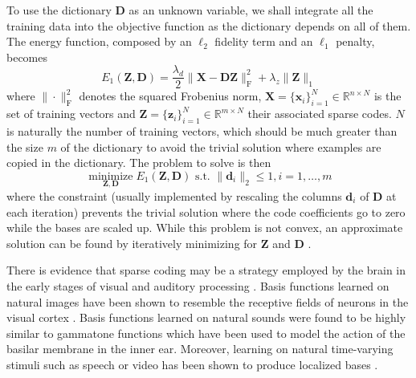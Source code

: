\documentclass[a4paper,12pt,twoside]{report}
\newcommand{\R}{\mathbb{R}}
\DeclareMathOperator*{\minimizeop}{minimize}
\newcommand{\minimize}[1]{\minimizeop\limits_{#1}}  %
\newcommand{\normO}[1]{\| #1 \|_1}
\newcommand{\normF}[1]{\| #1 \|_\text{F}^2}
\newcommand{\D}{\mathbf{D}}
\newcommand{\X}{\mathbf{X}}
\newcommand{\Z}{\mathbf{Z}}
\renewcommand{\d}{\mathbf{d}}
\newcommand{\x}{\mathbf{x}}
\newcommand{\z}{\mathbf{z}}
\newcommand{\Eone}{E_1(\Z, \D)}
\newcommand{\set}[2]{\{#1_i\}_{i=1}^#2}
\newcommand{\st}{\text{ s.t. }}
\newcommand{\cst}[2]{\|#1_#2\|_2 \leq 1}
\newcommand{\forallx}[2]{#1 = 1, \ldots, #2}
\newcommand{\cstd}{\cst{\d}{i}, \forallx{i}{m}}
\begin{document}
To use the dictionary $\D$ as an unknown variable, we shall integrate all the training data into the objective function as the dictionary depends on all of them. The energy function, composed by an $\ell_2$ fidelity term and an $\ell_1$ penalty, becomes
\begin{equation}\label{eqn:en_dict}
	\Eone = \frac{\lambda_d}{2} \normF{\X - \D \Z} + \lambda_z \normO{\Z}
\end{equation}
where $\normF{\cdot}$ denotes the squared Frobenius norm, $\X = \set{\x}{N} \in \R^{n \times N}$ is the set of training vectors and $\Z = \set{\z}{N} \in \R^{m \times N}$ their associated sparse codes. $N$ is naturally the number of training vectors, which should be much greater than the size $m$ of the dictionary to avoid the trivial solution where examples are copied in the dictionary. The problem to solve is then
\begin{equation}\label{eqn:pr_dict}
	\minimize{\Z,\D} \Eone \st \cstd
\end{equation}
where the constraint (usually implemented by rescaling the columns $\d_i$ of $\D$ at each iteration) prevents the trivial solution where the code coefficients go to zero while the bases are scaled up. While this problem is not convex, an approximate solution can be found by iteratively minimizing for $\Z$ and $\D$ \cite{olshausen1996SparseV1}.

There is evidence that sparse coding may be a strategy employed by the brain in the early stages of visual and auditory processing \cite{olshausen1996SparseV1, olshausen1997SparseV1, smith2006SparseAudio}. Basis functions learned on natural images have been shown to resemble the receptive fields of neurons in the visual cortex \cite{olshausen1996SparseV1, olshausen1997SparseV1}. Basis functions learned on natural sounds were found to be highly similar to gammatone functions \cite{smith2006SparseAudio} which have been used to model the action of the basilar membrane in the inner ear. Moreover, learning on natural time-varying stimuli such as speech or video has been shown to produce localized bases \cite{lewicki2000SparseSpeech, olshausen2000SparseVideo}.
\end{document}
